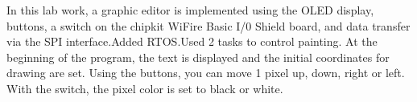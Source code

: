 In this lab work, a graphic editor is implemented using the O\+L\+ED display, buttons, a switch on the chipkit Wi\+Fire Basic I/0 Shield board, and data transfer via the S\+PI interface.\+Added R\+T\+O\+S.\+Used 2 tasks to control painting. At the beginning of the program, the text is displayed and the initial coordinates for drawing are set. Using the buttons, you can move 1 pixel up, down, right or left. With the switch, the pixel color is set to black or white. 